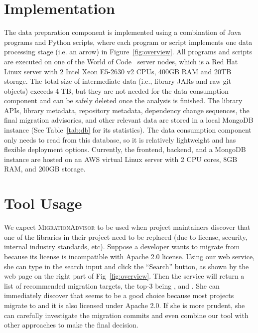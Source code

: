 \documentclass[conference,10pt]{IEEEtran}
\begin{document}
\section{Implementation}\label{s:implementation}


The data preparation component is implemented using a combination of Java programs and Python scripts, where each program or script implements one data processing stage (i.e. an arrow) in Figure~\ref{fig:overview}.
All programs and scripts are executed on one of the World of Code~\cite{ma2019world} server nodes, which is a Red Hat Linux server with 2 Intel Xeon E5-2630 v2 CPUs, 400GB RAM and 20TB storage. 
The total size of intermediate data (i.e., library JARs and raw git objects) exceeds 4 TB, but they are not needed for the data consumption component and can be safely deleted once the analysis is finished.
The library APIs, library metadata, repository metadata, dependency change sequences, the final migration advisories, and other relevant data are stored in a local MongoDB instance (See Table~\ref{tab:db} for its statistics).
The data consumption component only needs to read from this database, so it is relatively lightweight and has flexible deployment options.
Currently, the frontend, backend, and a MongoDB instance are hosted on an AWS virtual Linux server with 2 CPU cores, 8GB RAM, and 200GB storage. 

\section{Tool Usage}

We expect \textsc{MigrationAdvisor} to be used when project maintainers discover that one of the libraries in their project need to be replaced (due to license, security, internal industry standards, etc).
Suppose a developer wants to migrate from  because its license is incompatible with Apache 2.0 license.
Using our web service, she can type  in the search input and click the ``Search'' button, as shown by the web page on the right part of Fig~\ref{fig:overview}.
Then the service will return a list of recommended migration targets, the top-3 being ,  and .
She can immediately discover that  seems to be a good choice because most projects migrate to  and it is also licensed under Apache 2.0.
If she is more prudent, she can carefully investigate the migration commits and even combine our tool with other approaches to make the final decision.
\end{document}
